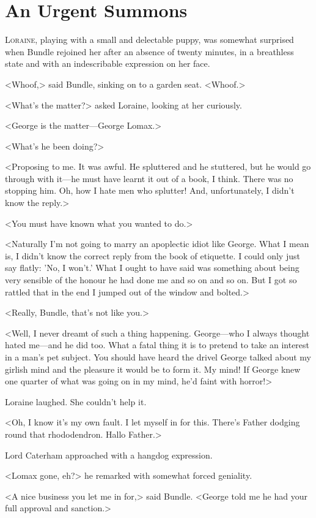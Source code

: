 \chapter{An Urgent Summons}

\lettrine{L}{oraine,} playing with a small and delectable puppy, was somewhat surprised when Bundle rejoined her after an absence of twenty minutes, in a breathless state and with an indescribable expression on her face.

\zz
<Whoof,> said Bundle, sinking on to a garden seat. <Whoof.>

<What's the matter?> asked Loraine, looking at her curiously.

<George is the matter—George Lomax.>

<What's he been doing?>

<Proposing to me. It was awful. He spluttered and he stuttered, but he would go through with it—he must have learnt it out of a book, I think. There was no stopping him. Oh, how I hate men who splutter! And, unfortunately, I didn't know the reply.>

<You must have known what you wanted to do.>

<Naturally I'm not going to marry an apoplectic idiot like George. What I mean is, I didn't know the correct reply from the book of etiquette. I could only just say flatly: 'No, I won't.' What I ought to have said was something about being very sensible of the honour he had done me and so on and so on. But I got so rattled that in the end I jumped out of the window and bolted.>

<Really, Bundle, that's not like you.>

<Well, I never dreamt of such a thing happening. George—who I always thought hated me—and he did too. What a fatal thing it is to pretend to take an interest in a man's pet subject. You should have heard the drivel George talked about my girlish mind and the pleasure it would be to form it. My mind! If George knew one quarter of what was going on in my mind, he'd faint with horror!>

Loraine laughed. She couldn't help it.

<Oh, I know it's my own fault. I let myself in for this. There's Father dodging round that rhododendron. Hallo Father.>

Lord Caterham approached with a hangdog expression.

<Lomax gone, eh?> he remarked with somewhat forced geniality.

<A nice business you let me in for,> said Bundle. <George told me he had your full approval and sanction.>

